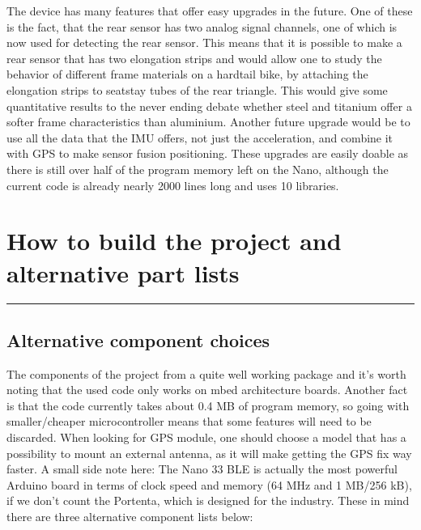 \documentclass[a4paper,11pt]{article} %
\begin{document}
The device has many features that offer easy upgrades in the future. One of these is the fact, that the rear sensor has two analog signal channels, one of which is now used for detecting the rear sensor. This means that it is possible to make a rear sensor that has two elongation strips and would allow one to study the behavior of different frame materials on a hardtail bike, by attaching the elongation strips to seatstay tubes of the rear triangle. This would give some quantitative results to the never ending debate whether steel and titanium offer a softer frame characteristics than aluminium. Another future upgrade would be to use all the data that the IMU offers, not just the acceleration, and combine it with GPS to make sensor fusion positioning. These upgrades are easily doable as there is still over half of the program memory left on the Nano, although the current code is already nearly 2000 lines long and uses 10 libraries.


\newpage
\section{How to build the project and alternative part lists}
\rule{12.7cm}{0.4pt}

\subsection{Alternative component choices}

The components of the project from a quite well working package and it's worth noting that the used code only works on mbed architecture boards. Another fact is that the code currently takes about 0.4 MB of program memory, so going with smaller/cheaper microcontroller means that some features will need to be discarded. When looking for GPS module, one should choose a model that has a possibility to mount an external antenna, as it will make getting the GPS fix way faster. A small side note here: The Nano 33 BLE is actually the most powerful Arduino board in terms of clock speed and memory (64 MHz and 1 MB/256 kB), if we don't count the Portenta, which is designed for the industry. These in mind there are three alternative component lists below:
\end{document}
